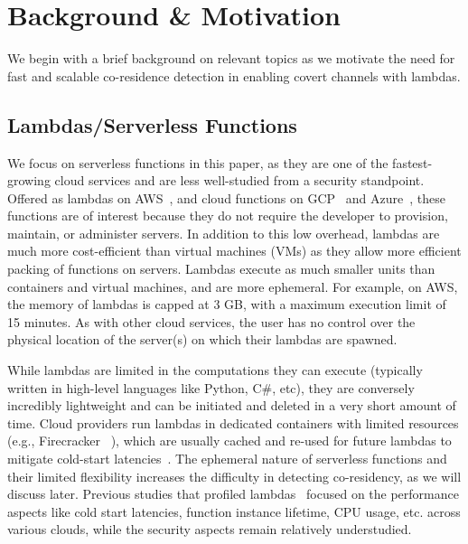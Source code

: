 \section{Background \& Motivation}
\label{sec:background}

We begin with a brief background on relevant topics as we motivate 
the need for fast and scalable co-residence detection in
enabling covert channels with lambdas.


\subsection{Lambdas/Serverless Functions} 
\label{sec:background:lambdas}

We focus on serverless functions in this paper, as they are one of the
fastest-growing cloud services and are less well-studied from a security 
standpoint. Offered as lambdas on
AWS~\cite{awslambda}, and cloud functions on GCP~\cite{gcpfunctions} and 
Azure~\cite{azurefunctions}, these functions are of interest because they do 
not require the developer
to provision, maintain, or administer servers. In addition to this low overhead,
lambdas are much more cost-efficient than virtual machines (VMs) as they allow
more efficient packing of functions on servers. Lambdas execute as much smaller
units than containers and virtual machines, and are more ephemeral. 
For example, on AWS, the memory 
of lambdas is capped at 3 GB, with a maximum execution limit of 15 minutes. 
As with other cloud services, the user has no control over the physical location
of the server(s) on which their lambdas are spawned.

While lambdas are limited in the computations they can execute (typically 
written in high-level languages like Python, C\#, etc), 
they are conversely incredibly lightweight and
can be initiated and deleted in a very short amount of time. Cloud providers 
run lambdas in dedicated containers with limited resources (e.g., Firecracker
~\cite{firecracker}), which are usually cached and re-used for future lambdas 
to mitigate cold-start latencies~\cite{awscontainerreuse}. The ephemeral nature of serverless
functions and their limited flexibility increases the difficulty in detecting 
co-residency, as we will discuss later. Previous studies that profiled 
lambdas~\cite{wangusenix2018} focused on the performance aspects like 
cold start latencies, function instance lifetime, CPU usage, etc. 
across various clouds, while the security aspects remain relatively understudied.


